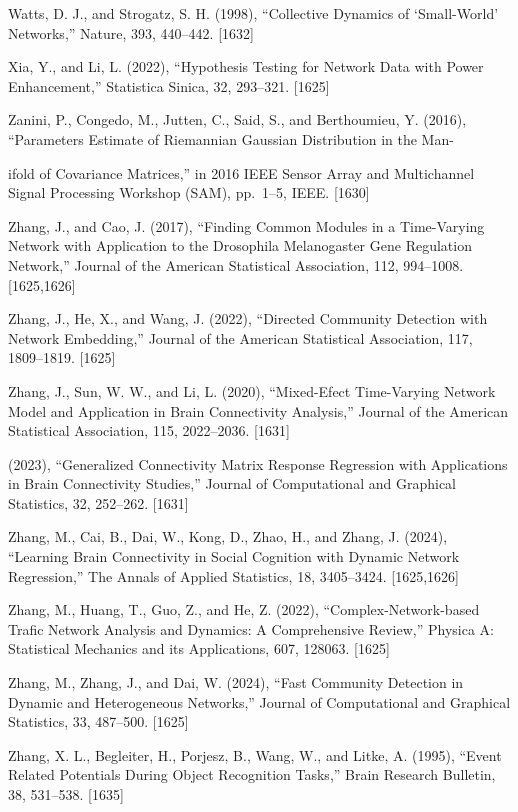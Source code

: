 \documentclass[
  10
]{article}
\begin{document}
Watts, D. J., and Strogatz, S. H. (1998), ``Collective Dynamics of
`Small-World' Networks,'' Nature, 393, 440--442. {[}1632{]}

Xia, Y., and Li, L. (2022), ``Hypothesis Testing for Network Data with
Power Enhancement,'' Statistica Sinica, 32, 293--321. {[}1625{]}

Zanini, P., Congedo, M., Jutten, C., Said, S., and Berthoumieu, Y.
(2016), ``Parameters Estimate of Riemannian Gaussian Distribution in the
Man-

ifold of Covariance Matrices,'' in 2016 IEEE Sensor Array and
Multichannel Signal Processing Workshop (SAM), pp.~1--5, IEEE.
{[}1630{]}

Zhang, J., and Cao, J. (2017), ``Finding Common Modules in a
Time-Varying Network with Application to the Drosophila Melanogaster
Gene Regulation Network,'' Journal of the American Statistical
Association, 112, 994--1008. {[}1625,1626{]}

Zhang, J., He, X., and Wang, J. (2022), ``Directed Community Detection
with Network Embedding,'' Journal of the American Statistical
Association, 117, 1809--1819. {[}1625{]}

Zhang, J., Sun, W. W., and Li, L. (2020), ``Mixed-Efect Time-Varying
Network Model and Application in Brain Connectivity Analysis,'' Journal
of the American Statistical Association, 115, 2022--2036. {[}1631{]}

(2023), ``Generalized Connectivity Matrix Response Regression with
Applications in Brain Connectivity Studies,'' Journal of Computational
and Graphical Statistics, 32, 252--262. {[}1631{]}

Zhang, M., Cai, B., Dai, W., Kong, D., Zhao, H., and Zhang, J. (2024),
``Learning Brain Connectivity in Social Cognition with Dynamic Network
Regression,'' The Annals of Applied Statistics, 18, 3405--3424.
{[}1625,1626{]}

Zhang, M., Huang, T., Guo, Z., and He, Z. (2022),
``Complex-Network-based Trafic Network Analysis and Dynamics: A
Comprehensive Review,'' Physica A: Statistical Mechanics and its
Applications, 607, 128063. {[}1625{]}

Zhang, M., Zhang, J., and Dai, W. (2024), ``Fast Community Detection in
Dynamic and Heterogeneous Networks,'' Journal of Computational and
Graphical Statistics, 33, 487--500. {[}1625{]}

Zhang, X. L., Begleiter, H., Porjesz, B., Wang, W., and Litke, A.
(1995), ``Event Related Potentials During Object Recognition Tasks,''
Brain Research Bulletin, 38, 531--538. {[}1635{]}
\end{document}
